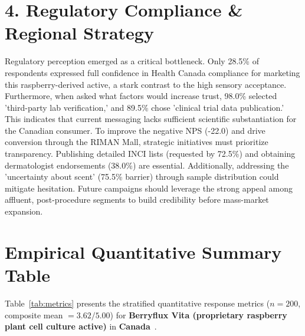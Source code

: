 \documentclass[10pt,twocolumn,a4paper]{article}
\begin{document}
\section{4. Regulatory Compliance \& Regional Strategy}
Regulatory perception emerged as a critical bottleneck. Only 28.5\% of respondents expressed full confidence in Health Canada compliance for marketing this raspberry-derived active, a stark contrast to the high sensory acceptance. Furthermore, when asked what factors would increase trust, 98.0\% selected 'third-party lab verification,' and 89.5\% chose 'clinical trial data publication.' This indicates that current messaging lacks sufficient scientific substantiation for the Canadian consumer. To improve the negative NPS (-22.0) and drive conversion through the RIMAN Mall, strategic initiatives must prioritize transparency. Publishing detailed INCI lists (requested by 72.5\%) and obtaining dermatologist endorsements (38.0\%) are essential. Additionally, addressing the 'uncertainty about scent' (75.5\% barrier) through sample distribution could mitigate hesitation. Future campaigns should leverage the strong appeal among affluent, post-procedure segments to build credibility before mass-market expansion.


\section{Empirical Quantitative Summary Table}
Table~\ref{tab:metrics} presents the stratified quantitative response metrics ($n = 200$, composite mean $= 3.62/5.00$) for \textbf{Berryflux Vita (proprietary raspberry plant cell culture active)} in \textbf{Canada}~\cite{ref_kaggle_doi,ref_hf_doi}.
\end{document}
